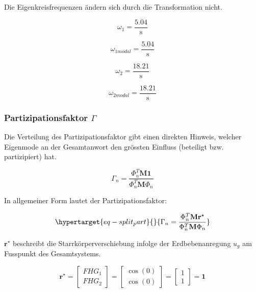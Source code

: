 \documentclass[
  letterpaper,
  DIV=11]{scrreprt}
\begin{document}
Die Eigenkreisfrequenzen ändern sich durch die Transformation nicht.

\begin{equation}\omega_{1} = \frac{5.04}{\text{s}}\end{equation}

\begin{equation}\omega_{1 modal} = \frac{5.04}{\text{s}}\end{equation}

\begin{equation}\omega_{2} = \frac{18.21}{\text{s}}\end{equation}

\begin{equation}\omega_{2 modal} = \frac{18.21}{\text{s}}\end{equation}

\hypertarget{partizipationsfaktor-gamma-2}{%
\subsubsection{\texorpdfstring{Partizipationsfaktor
\(\Gamma\)}{Partizipationsfaktor \textbackslash Gamma}}\label{partizipationsfaktor-gamma-2}}

Die Verteilung des Partizipationsfaktor gibt einen direkten Hinweis,
welcher Eigenmode an der Gesamtanwort den grössten Einfluss (beteiligt
bzw. partizipiert) hat.

\[\Gamma_n = \frac{\Phi_n^T \mathbf{M 1}}{\Phi_n^T \mathbf{M}\Phi_n}\]

In allgemeiner Form lautet der Partizipationsfaktor:

\begin{equation}\protect\hypertarget{eq-split_part}{}{
\Gamma_n = \frac{\Phi_n^T \mathbf{M r^\star}}{\Phi_n^T \mathbf{M}\Phi_n}
}\label{eq-split_part}\end{equation}

\(\mathbf{r^\star}\) beschreibt die Starrkörperverschiebung infolge der
Erdbebenanregung \(u_g\) am Fusspunkt des Gesamtsystems.

\[\mathbf{r^\star} = \begin{bmatrix}
FHG_1 \\
FHG_2 
\end{bmatrix}=
\begin{bmatrix}
\cos(0) \\
\cos(0) 
\end{bmatrix}=
\begin{bmatrix}
1 \\
1 
\end{bmatrix}= \mathbf{1}\]
\end{document}
